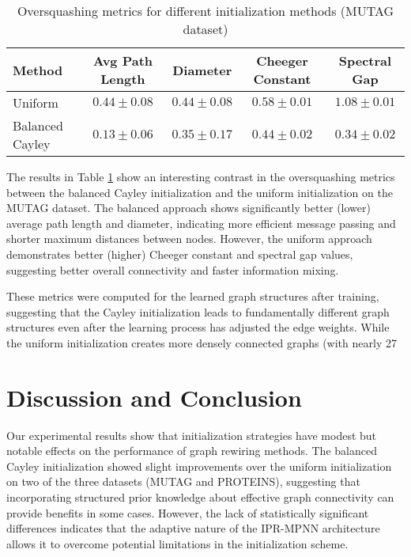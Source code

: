 \documentclass[11pt,a4paper]{article}
\begin{document}
\begin{table}[htb]
\centering
\caption{Oversquashing metrics for different initialization methods (MUTAG dataset)}
\label{tab:oversquashing_metrics}
\begin{tabular}{lcccc}
\toprule
Method & Avg Path Length & Diameter & Cheeger Constant & Spectral Gap \\
\midrule
Uniform & $0.44 \pm 0.08$ & $0.44 \pm 0.08$ & $0.58 \pm 0.01$ & $1.08 \pm 0.01$ \\
Balanced Cayley & $\mathbf{0.13 \pm 0.06}$ & $\mathbf{0.35 \pm 0.17}$ & $0.44 \pm 0.02$ & $0.34 \pm 0.02$ \\
\bottomrule
\end{tabular}
\end{table}

The results in Table \ref{tab:oversquashing_metrics} show an interesting contrast in the oversquashing metrics between the balanced Cayley initialization and the uniform initialization on the MUTAG dataset. The balanced approach shows significantly better (lower) average path length and diameter, indicating more efficient message passing and shorter maximum distances between nodes. However, the uniform approach demonstrates better (higher) Cheeger constant and spectral gap values, suggesting better overall connectivity and faster information mixing.

These metrics were computed for the learned graph structures after training, suggesting that the Cayley initialization leads to fundamentally different graph structures even after the learning process has adjusted the edge weights. While the uniform initialization creates more densely connected graphs (with nearly 27%

\section{Discussion and Conclusion}
\label{sec:conclusion}

Our experimental results show that initialization strategies have modest but notable effects on the performance of graph rewiring methods. The balanced Cayley initialization showed slight improvements over the uniform initialization on two of the three datasets (MUTAG and PROTEINS), suggesting that incorporating structured prior knowledge about effective graph connectivity can provide benefits in some cases. However, the lack of statistically significant differences indicates that the adaptive nature of the IPR-MPNN architecture allows it to overcome potential limitations in the initialization scheme.
\end{document}
